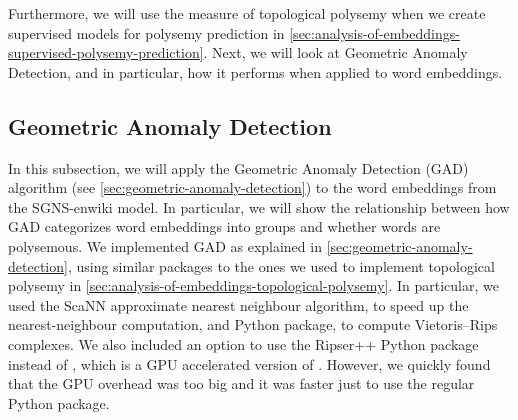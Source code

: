 Furthermore, we will use the measure of topological polysemy when we create supervised models for polysemy prediction in \cref{sec:analysis-of-embeddings-supervised-polysemy-prediction}. Next, we will look at Geometric Anomaly Detection, and in particular, how it performs when applied to word embeddings.

\subsection{Geometric Anomaly Detection}
\label{sec:analysis-of-embeddings-geometric-anomaly-detection}
In this subsection, we will apply the Geometric Anomaly Detection (GAD) algorithm (see \cref{sec:geometric-anomaly-detection}) to the word embeddings from the SGNS-enwiki model. In particular, we will show the relationship between how GAD categorizes word embeddings into groups and whether words are polysemous. We implemented GAD as explained in \cref{sec:geometric-anomaly-detection}, using similar packages to the ones we used to implement topological polysemy in \cref{sec:analysis-of-embeddings-topological-polysemy}. In particular, we used the ScaNN \cite{scann2020} approximate nearest neighbour algorithm, to speed up the nearest-neighbour computation, and  \cite{ctralie2018ripser} Python package, to compute Vietoris–Rips complexes. We also included an option to use the Ripser++ \cite{zhang2020ripserplusplus} Python package instead of , which is a GPU accelerated version of . However, we quickly found that the GPU overhead was too big and it was faster just to use the regular  Python package.

